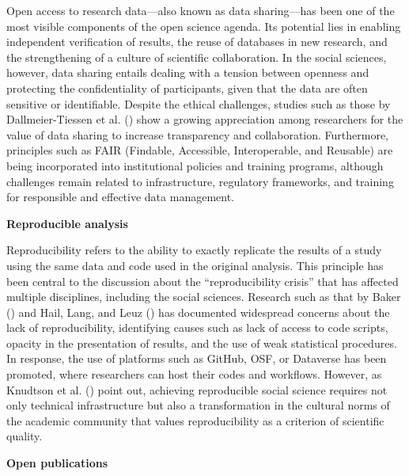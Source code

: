 \documentclass[
  english,
  letterpaper,
]{article}
\begin{document}
Open access to research data---also known as data sharing---has been one
of the most visible components of the open science agenda. Its potential
lies in enabling independent verification of results, the reuse of
databases in new research, and the strengthening of a culture of
scientific collaboration. In the social sciences, however, data sharing
entails dealing with a tension between openness and protecting the
confidentiality of participants, given that the data are often sensitive
or identifiable. Despite the ethical challenges, studies such as those
by Dallmeier-Tiessen et al.
() show a growing
appreciation among researchers for the value of data sharing to increase
transparency and collaboration. Furthermore, principles such as FAIR
(Findable, Accessible, Interoperable, and Reusable) are being
incorporated into institutional policies and training programs, although
challenges remain related to infrastructure, regulatory frameworks, and
training for responsible and effective data management.

\textbf{Reproducible analysis}

Reproducibility refers to the ability to exactly replicate the results
of a study using the same data and code used in the original analysis.
This principle has been central to the discussion about the
``reproducibility crisis'' that has affected multiple disciplines,
including the social sciences. Research such as that by Baker
() and Hail, Lang, and Leuz
() has documented
widespread concerns about the lack of reproducibility, identifying
causes such as lack of access to code scripts, opacity in the
presentation of results, and the use of weak statistical procedures. In
response, the use of platforms such as GitHub, OSF, or Dataverse has
been promoted, where researchers can host their codes and workflows.
However, as Knudtson et al. ()
point out, achieving reproducible social science requires not only
technical infrastructure but also a transformation in the cultural norms
of the academic community that values reproducibility as a criterion of
scientific quality.

\textbf{Open publications}
\end{document}
